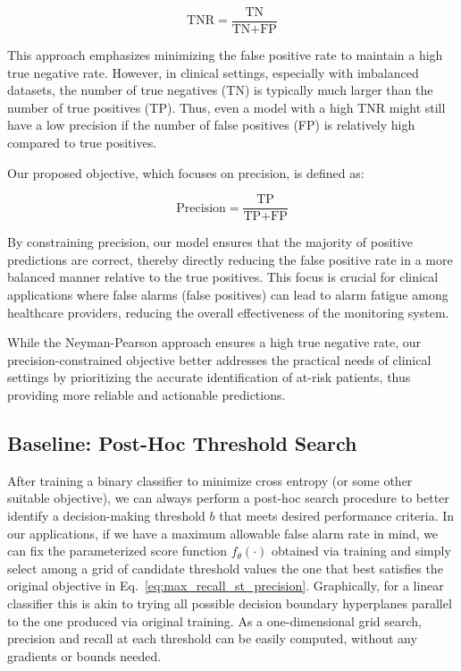 \[
\text{TNR} = \frac{\text{TN}}{\text{TN} + \text{FP}}
\]

This approach emphasizes minimizing the false positive rate to maintain a high true negative rate. However, in clinical settings, especially with imbalanced datasets, the number of true negatives (TN) is typically much larger than the number of true positives (TP). Thus, even a model with a high TNR might still have a low precision if the number of false positives (FP) is relatively high compared to true positives.

Our proposed objective, which focuses on precision, is defined as:

\[
\text{Precision} = \frac{\text{TP}}{\text{TP} + \text{FP}}
\]

By constraining precision, our model ensures that the majority of positive predictions are correct, thereby directly reducing the false positive rate in a more balanced manner relative to the true positives. This focus is crucial for clinical applications where false alarms (false positives) can lead to alarm fatigue among healthcare providers, reducing the overall effectiveness of the monitoring system.

While the Neyman-Pearson approach ensures a high true negative rate, our precision-constrained objective better addresses the practical needs of clinical settings by prioritizing the accurate identification of at-risk patients, thus providing more reliable and actionable predictions.




\subsection{Baseline: Post-Hoc Threshold Search}

After training a binary classifier to minimize cross entropy (or some other suitable objective), we can always perform a post-hoc search procedure to better identify a decision-making threshold $b$ that meets desired performance criteria. In our applications, if we have a maximum allowable false alarm rate in mind, we can fix the parameterized score function $f_{\theta}(\cdot)$ obtained via training and simply select among a grid of candidate threshold values the one that best satisfies the original objective in Eq.~\eqref{eq:max_recall_st_precision}.
Graphically, for a linear classifier this is akin to trying all possible decision boundary hyperplanes parallel to the one produced via original training.
As a one-dimensional grid search, precision and recall at each threshold can be easily computed, without any gradients or bounds needed.

